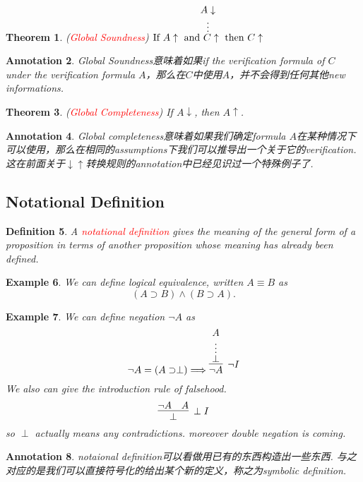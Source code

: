 \documentclass{article}
\theoremstyle{plain}
\newtheorem{theorem}{Theorem}
\newtheorem{example}[theorem]{Example}
\newtheorem{definition}[theorem]{Definition}
\newtheorem{annotation}[theorem]{Annotation}
\theoremstyle{nonumberplain}
\newcommand{\redt}[1]{\textcolor{red}{#1}}
\begin{document}
\begin{theorem}
\rm (\redt{Global Soundness}) $\deduce[\vdots]{\text{If}~A \uparrow~\text{and}~C\uparrow~\text{then}~C \uparrow}{A \downarrow}$
\end{theorem}

\begin{annotation}
\rm Global Soundness意味着如果if the verification formula of $C$ under the verification formula $A$，那么在$C$中使用$A$，并不会得到任何其他new informations.
\end{annotation}

\begin{theorem}
\rm (\redt{Global Completeness}) If $A \downarrow$, then $A \uparrow$. 
\end{theorem}

\begin{annotation}
\rm Global completeness意味着如果我们确定formula $A$在某种情况下可以使用，那么在相同的assumptions下我们可以推导出一个关于它的verification. 这在前面关于$\downarrow\uparrow$转换规则的annotation中已经见识过一个特殊例子了. 
\end{annotation}

\newpage
\subsection{Notational Definition}

\begin{definition}
\rm A \redt{notational definition} gives the meaning of the general form of a proposition in terms of another proposition whose meaning has already been defined.
\end{definition}

\begin{example}
\rm We can define logical equivalence, written $A \equiv B$ as 
$$
(A \supset B) \wedge (B \supset A).
$$ 
\end{example}

\begin{example}
\rm We can define negation $\neg A$ as 
$$
\neg A = (A \supset \perp) \Longrightarrow \infer[\neg I]{\neg A}{\deduce[\vdots]{\perp}{A}}
$$
We also can give the introduction rule of falsehood.
$$
\infer[\perp I]{\perp}{\neg A & A}
$$
so $\perp$ actually means any contradictions. moreover double negation is coming.
\end{example}

\begin{annotation}
\rm notaional definition可以看做用已有的东西构造出一些东西. 与之对应的是我们可以直接符号化的给出某个新的定义，称之为symbolic definition. 
\end{annotation}
\end{document}
